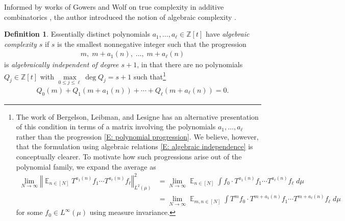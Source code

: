 \documentclass[11pt]{amsart}
\theoremstyle{definition}
\newtheorem{definition}[lemma]{Definition}
\DeclareMathOperator*{\E}{\mathbb{E}}
\newcommand{\Z}{{\mathbb Z}}
\newcommand{\norm}[1]{\left\Vert #1\right\Vert}
\newcommand{\1}{{\mathbf{1}}}
\begin{document}
Informed by works  of Gowers and Wolf on true complexity in additive combinatorics \cite{gowers_wolf_2010, gowers_wolf_2011a, gowers_wolf_2011b, gowers_wolf_2011c}, the author introduced the notion of algebraic complexity \cite{Kuc22a}.
\begin{definition}
    Essentially distinct polynomials $a_1, \ldots, a_\ell\in\Z[t]$ have \emph{algebraic complexity $s$} if $s$ is the smallest nonnegative integer such that the progression
        \begin{align}\label{E: polynomial progression}
            m,\; m + a_1(n),\; \ldots,\; m+a_\ell(n)
        \end{align}
        is \emph{algebraically independent of degree $s+1$}, in that there are no polynomials $Q_j\in\Z[t]$ with $\max\limits_{0\leq j\leq \ell}\deg Q_j = s+1$ such that\footnote{The work of Bergelson, Leibman, and Lesigne \cite{BLL07} has an alternative presentation of this condition in terms of a matrix involving the polynomials $a_1, \ldots, a_\ell$ rather than the progression \eqref{E: polynomial progression}. We believe, however, that the formulation using algebraic relations \eqref{E: algebraic independence} is conceptually clearer. To motivate how such progressions arise out of the polynomial family, we expand the average as
        \begin{align*}
            \lim_{N\to\infty}\norm{\E_{n\in[N]}T^{a_1(n)}f_1\cdots T^{a_\ell(n)}f_\ell}_{L^2(\mu)}^2 &= \lim_{N\to\infty}\E_{n\in[N]}\int f_0\cdot T^{a_1(n)}f_1\cdots T^{a_\ell(n)}f_\ell\; d\mu\\
            &= \lim_{N\to\infty}\E_{m,n\in[N]}\int T^m f_0\cdot T^{m+a_1(n)}f_1\cdots T^{m+a_\ell(n)}f_\ell\; d\mu
        \end{align*}
        for some $f_0\in L^\infty(\mu)$ using measure invariance. 
        }
        \begin{align}\label{E: algebraic independence}
            Q_0(m) + Q_1(m+a_1(n)) + \cdots + Q_\ell(m+a_\ell(n)) = 0.
        \end{align}
\end{definition}
\end{document}
